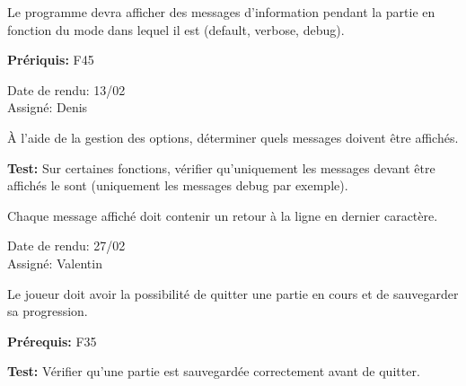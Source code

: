 \documentclass{article}
\begin{document}
\begin{needbox}
    Le programme devra afficher des messages d'information
    pendant la partie en fonction du mode dans lequel il est
    (default, verbose, debug).

    \textbf{Prériquis:} F45
    \begin{duedatebox}
        Date de rendu: 13/02\\
        Assigné: Denis
    \end{duedatebox}
    \begin{subneedbox}
        À l'aide de la gestion des options, déterminer quels messages doivent être affichés.

        \textbf{Test:} Sur certaines fonctions, vérifier qu'uniquement les messages devant
        être affichés le sont (uniquement les messages debug par exemple).
    \end{subneedbox}
    \begin{subneedbox}
        Chaque message affiché doit contenir un retour à la ligne en dernier caractère.
    \end{subneedbox}
\end{needbox}

\begin{needbox}
    \begin{duedatebox}
        Date de rendu: 27/02\\
        Assigné: Valentin
    \end{duedatebox}
    \begin{subneedbox}
        Le joueur doit avoir la possibilité de quitter une partie en cours 
        et de sauvegarder sa progression.
    \end{subneedbox}

    \textbf{Prérequis:} F35

    \textbf{Test:} Vérifier qu'une partie est sauvegardée correctement avant de quitter.
\end{needbox}
\end{document}
